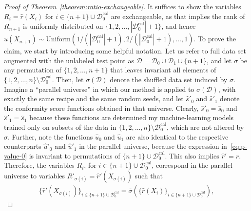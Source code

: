 \documentclass[11pt]{article}
\begin{document}
\begin{proof}[Proof of Theorem~\ref{theorem:ratio-exchangeable}]
It suffices to show the variables $R_i = \hat{r}(X_i)$ for $i \in \{n+1\} \cup \mathcal{D}_0^{\mathrm{cal}}$ are exchangeable, as that implies the rank of $R_{n+1}$ is uniformly distributed on $\{1,2,\ldots,|\mathcal{D}_0^{\mathrm{cal}}|+1\}$, and hence $\hat{u}(X_{n+1}) \sim \text{Uniform}\left(1/(|\mathcal{D}_0^{\mathrm{cal}}|+1), 2/(|\mathcal{D}_0^{\mathrm{cal}}|+1), \ldots, 1\right)$.
To prove the claim, we start by introducing some helpful notation.
Let us refer to full data set augmented with the unlabeled test point as $\mathcal{D} = \mathcal{D}_0 \cup \mathcal{D}_1 \cup \{n+1\}$, and let $\sigma$ be any permutation of $\{1,2,\ldots,n+1\}$ that leaves invariant all elements of $\{1,2,\ldots,n\} \setminus \mathcal{D}_0^{\mathrm{cal}}$.
Then, let $\sigma(\mathcal{D})$ denote the shuffled data set induced by $\sigma$.
Imagine a ``parallel universe'' in which our method is applied to $\sigma(\mathcal{D})$, with exactly the same recipe and the same random seeds, and let  $\hat{s}'_0$ and $\hat{s}'_1$ denote the conformity score functions obtained in that universe. Clearly, $\hat{s}'_0 = \hat{s}_0$ and $\hat{s}'_1 = \hat{s}_1$ because these functions are determined my machine-learning models trained only on subsets of the data in $\{1,2,\ldots,n\} \setminus \mathcal{D}_0^{\mathrm{cal}}$, which are not altered by $\sigma$.
Further, note the functions $\hat{u}_0$ and $\hat{u}_1$ are also identical to the respective counterparts $\hat{u}'_0$ and $\hat{u}'_1$ in the parallel universe, because the expression in~\eqref{eq:p-value-0} is invariant to permutations of $\{n+1\} \cup \mathcal{D}_{0}^{\mathrm{cal}}$.
This also implies $\hat{r}' = \hat{r}$.
Therefore, the variables $R_i$, for $i \in \{n+1\} \cup \mathcal{D}_{0}^{\mathrm{cal}}$, correspond in the parallel universe to variables $R'_{\sigma(i)} = \hat{r}'(X_{\sigma(i)})$ such that
\begin{align*}
  \{\hat{r}'(X_{\sigma(i)})\}_{i \in \{n+1\} \cup \mathcal{D}_{0}^{\mathrm{cal}}}
  = \bar{\sigma}(\{\hat{r}(X_i)\}_{i \in \{n+1\} \cup \mathcal{D}_{0}^{\mathrm{cal}}}),
\end{align*}

\end{proof}
\end{document}
